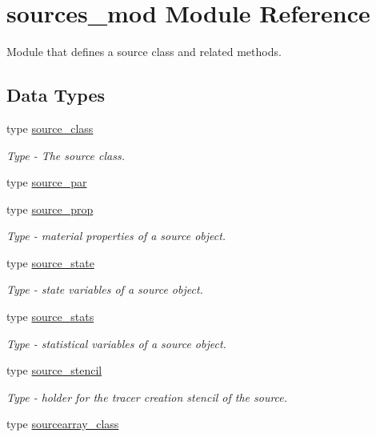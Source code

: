 \hypertarget{namespacesources__mod}{}\section{sources\+\_\+mod Module Reference}
\label{namespacesources__mod}


Module that defines a source class and related methods.  


\subsection*{Data Types}
\begin{DoxyCompactItemize}
\item 
type \mbox{\hyperlink{structsources__mod_1_1source__class}{source\+\_\+class}}
\begin{DoxyCompactList}\small\item\em Type -\/ The source class. \end{DoxyCompactList}\item 
type \mbox{\hyperlink{structsources__mod_1_1source__par}{source\+\_\+par}}
\item 
type \mbox{\hyperlink{structsources__mod_1_1source__prop}{source\+\_\+prop}}
\begin{DoxyCompactList}\small\item\em Type -\/ material properties of a source object. \end{DoxyCompactList}\item 
type \mbox{\hyperlink{structsources__mod_1_1source__state}{source\+\_\+state}}
\begin{DoxyCompactList}\small\item\em Type -\/ state variables of a source object. \end{DoxyCompactList}\item 
type \mbox{\hyperlink{structsources__mod_1_1source__stats}{source\+\_\+stats}}
\begin{DoxyCompactList}\small\item\em Type -\/ statistical variables of a source object. \end{DoxyCompactList}\item 
type \mbox{\hyperlink{structsources__mod_1_1source__stencil}{source\+\_\+stencil}}
\begin{DoxyCompactList}\small\item\em Type -\/ holder for the tracer creation stencil of the source. \end{DoxyCompactList}\item 
type \mbox{\hyperlink{structsources__mod_1_1sourcearray__class}{sourcearray\+\_\+class}}
\end{DoxyCompactItemize}
